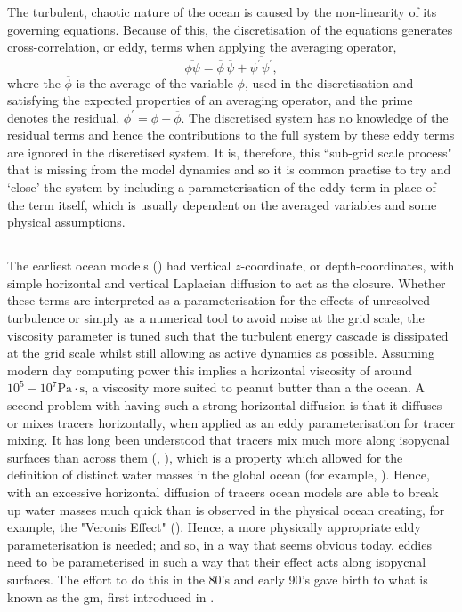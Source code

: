 \documentclass[10pt,a4paper]{report}
\newcommand*\mean[1]{\overline{#1}}
\newcommand*\res[1]{{#1}^{\prime}}
\begin{document}
 The turbulent, chaotic nature of the ocean is caused by the non-linearity of its 
 governing equations. Because of this,  the discretisation of the equations generates cross-correlation, or eddy, terms when applying the 
 averaging operator,
 \begin{equation}
 \mean{\phi\psi} = \mean{\phi}\,\mean{\psi} + 
 \mean{\res{\psi}\res{\psi}},
 \label{non-lin average}
 \end{equation}
 where the ${\mean{\phi}}$ is the average of the variable ${\phi}$, used in
 the discretisation and satisfying
 the expected properties of an averaging operator, and the prime denotes the residual, ${\phi^{\prime} = \phi - \mean{\phi}}$.
 The discretised system has no knowledge of the residual terms and hence
 the contributions to the full system by these eddy terms are
 ignored in the discretised system. It is, therefore, this ``sub-grid scale process"
 that is missing from the model dynamics and so it is common practise to try and
 `close' the system by including a parameterisation of the eddy
 term in place of the term itself, which is usually dependent on the averaged 
 variables and some physical assumptions.
 
 \subsection{\cite{gent1990}}
 
 The earliest ocean models (\cite{bryan1969numerical}) had vertical $z$-coordinate, or depth-coordinates, with simple horizontal and vertical Laplacian diffusion to act as 
 the closure. Whether these terms are interpreted as a parameterisation for the effects
 of unresolved turbulence or simply as a numerical tool to avoid noise at 
 the grid scale, the viscosity parameter is tuned such that the turbulent energy cascade is 
 dissipated at the grid scale whilst still allowing as active dynamics as possible. 
 Assuming modern day computing power this implies a horizontal viscosity of around 
 $10^{5} - 10^{7} \mathrm{Pa} \cdot \mathrm{s}$, a viscosity more suited to peanut butter than 
 a the ocean. A second problem with having such a strong horizontal diffusion is
 that it diffuses or mixes tracers horizontally, when applied as
 an eddy parameterisation for tracer mixing. It has long been understood that tracers 
 mix much more along isopycnal surfaces than across them (\cite{iselin1939influence}, \cite{montgomery1940present}), which is a property which allowed for the definition of
 distinct water masses in the global ocean (for example, \cite{emery1986global}).
  Hence, with an excessive horizontal diffusion
 of tracers ocean models are able to break up water masses much quick than
 is observed in the physical ocean creating, for example, the "Veronis Effect" (\cite{veronis1975role}).
 Hence, a more physically appropriate eddy parameterisation 
 is needed;
  and so, in a way that seems obvious today, eddies need to be
   parameterised in 
 such a way that their effect acts along isopycnal surfaces. 
 The effort to do this in the 80's and early 90's gave birth
 to what is known as the \gls{gm}, first introduced in \cite{gent1990}.
 
\end{document}
